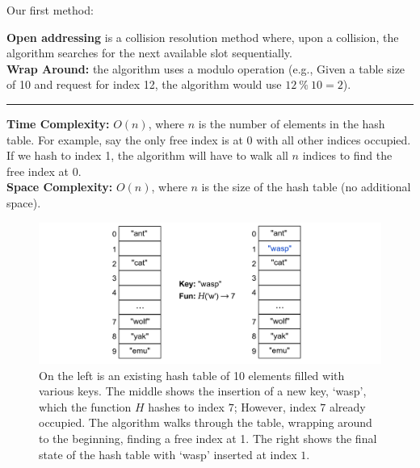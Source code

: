 \noindent
Our first method:
\begin{Def}

    \textbf{Open addressing} is a collision resolution method where, upon a collision, the algorithm searches for the next available slot sequentially.\\

    \noindent
    \textbf{Wrap Around:} the algorithm uses a modulo operation (e.g., Given a table size of 10 and request for index 12, the algorithm would use $12\ \%\ 10 = 2$).
    
    \noindent
    \rule{\textwidth}{0.4pt}

    \noindent
    \textbf{Time Complexity:} $O(n)$, where $n$ is the number of elements in the hash table. For example, say the only free index is at 0 with all other
    indices occupied. If we hash to index 1, the algorithm will have to walk all $n$ indices to find the free index at 0.\\
    \textbf{Space Complexity:} $O(n)$, where $n$ is the size of the hash table (no additional space).
\end{Def}

\begin{figure}[ht!]

    \centering
    \includegraphics[width=\textwidth]{Sections/hash/open_addressing.png}
    \caption{On the left is an existing hash table of 10 elements filled with various keys. The middle shows the insertion of a new key,
    `wasp', which the function $H$ hashes to index $7$; However, index $7$ already occupied. The algorithm walks through the table, wrapping around
    to the beginning, finding a free index at 1. The right shows the final state of the hash table with `wasp' inserted at index $1$.}
    \label{fig:open_addressing}
\end{figure}